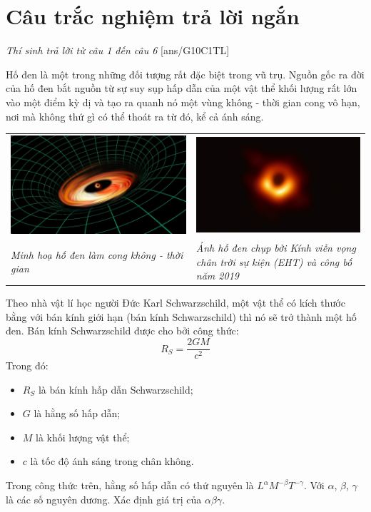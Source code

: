 \section{Câu trắc nghiệm trả lời ngắn} \textit{Thí sinh trả lời từ câu 1 đến câu 6}
\setcounter{ex}{0}
[ans/G10C1TL]
\begin{ex}
	Hố đen là một trong những đối tượng rất đặc biệt trong vũ trụ. Nguồn gốc ra đời của hố đen bắt nguồn từ sự suy sụp hấp dẫn của một vật thể khối lượng rất lớn vào một điểm kỳ dị và tạo ra quanh nó một vùng không - thời gian cong vô hạn, nơi mà không thứ gì có thể thoát ra từ đó, kể cả ánh sáng. 
	\begin{center}
		\begin{tabular}{M{7.5cm}M{7.5cm}}
			\includegraphics[width=0.7\linewidth]{figs/G10-CHUONG1-4}
			&\includegraphics[width=0.7\linewidth]{figs/G10-CHUONG1-5}\\
			\textit{Minh hoạ hố đen làm cong không - thời gian}& \textit{Ảnh hố đen chụp bởi Kính viễn vọng chân trời sự kiện (EHT) và công bố năm 2019} 
		\end{tabular}
	\end{center}
	Theo nhà vật lí học người Đức Karl Schwarzschild, một vật thể có kích thước bằng với bán kính giới hạn (bán kính Schwarzschild) thì nó sẽ trở thành một hố đen. Bán kính  Schwarzschild được cho bởi công thức:
	$$R_S=\dfrac{2GM}{c^2}$$
	Trong đó:
	\begin{itemize}
		\item $R_S$ là bán kính hấp dẫn Schwarzschild;
		\item $G$ là hằng số hấp dẫn;
		\item $M$ là khối lượng vật thể;
		\item $c$ là tốc độ ánh sáng trong chân không.
	\end{itemize}
	Trong công thức trên, hằng số hấp dẫn có thứ nguyên là $L^\alpha M^{-\beta}T^{-\gamma}$. Với $\alpha$, $\beta$, $\gamma$ là các số nguyên dương. Xác định giá trị của $\alpha\beta\gamma$.
	

\end{ex}
